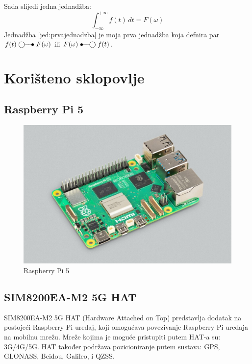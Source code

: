 \documentclass[zavrsnirad]{fer}
\begin{document}
Sada slijedi jedna jednadžba:
\begin{equation}
  \label{jed:prvajednadzba}
  \int_{-\infty}^{+\infty}f(t)\,dt=F(\omega)
\end{equation}
Jednadžba \eqref{jed:prvajednadzba} je moja prva jednadžba koja defnira par $f(t)\ufrek F(\omega)$ ili $F(\omega)\uvrem f(t)$.


\chapter{Korišteno sklopovlje}
\label{pog:koristeno_sklopovlje}

\section{Raspberry Pi 5}

\begin{figure}[htb]
  \centering
  \includegraphics[width=0.8\linewidth]{Figures/RaspberryPi5.jpg} 
  \caption{Raspberry Pi 5 \cite{EbenUpton}}
  \label{slk:raspberrypi5}
\end{figure}

\pagebreak

\section{SIM8200EA-M2 5G HAT}
\label{dio:sim8200ea}

SIM8200EA-M2 5G HAT (Hardware Attached on Top) predstavlja dodatak na postojeći Raspberry Pi uređaj, koji omogućava
povezivanje Raspberry Pi uređaja na mobilnu mrežu. Mreže kojima je moguće pristupiti putem HAT-a su: 3G/4G/5G. HAT također
podržava pozicioniranje putem sustava: GPS, GLONASS, Beidou, Galileo, i QZSS.
\end{document}
